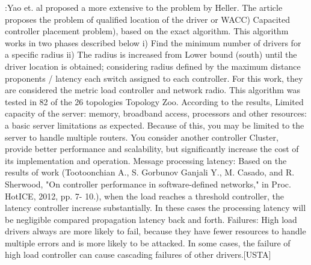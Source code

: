 \documentclass[a4paper,10pt]{article}
\begin{document}



\cite{YaBi14}:Yao et. al proposed a more extensive to the problem by Heller. The article proposes the problem of qualified location of the driver or WACC) Capacited controller placement problem), based on the exact algorithm. This algorithm works in two phases described below i) Find the minimum number of drivers for a specific radius ii) The radius is increased from Lower bound (south) until the driver location is obtained; considering radius defined by the maximum distance proponents / latency each switch assigned to each controller. For this work, they are considered the metric load controller and network radio. This algorithm was tested in 82 of the 26 topologies Topology Zoo. According to the results,
Limited capacity of the server: memory, broadband access, processors and other resources: a basic server limitations as expected. Because of this, you may be limited to the server to handle multiple routers. You consider another controller Cluster, provide better performance and scalability, but significantly increase the cost of its implementation and operation.
Message processing latency: Based on the results of work (Tootoonchian A., S. Gorbunov Ganjali Y., M. Casado, and R. Sherwood, "On controller performance in software-defined networks," in Proc. HotICE, 2012, pp. 7- 10.), when the load reaches a threshold controller, the latency controller increase substantially. In these cases the processing latency will be negligible compared propagation latency back and forth.
Failures: High load drivers always are more likely to fail, because they have fewer resources to handle multiple errors and is more likely to be attacked. In some cases, the failure of high load controller can cause cascading failures of other drivers.[USTA]
\end{document}
